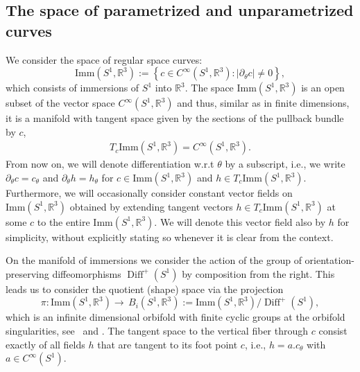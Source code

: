 \documentclass[12pt]{amsart}
\newcommand{\rev}[1]{#1}
\theoremstyle{definition}
\newcommand{\R}{\mathbb R}
\newcommand{\Diffp}{\operatorname{Diff}^+(S^1)}
\newcommand{\Imm}{\mathrm{Imm}}
\def\R{{\mathbb R}}
\begin{document}
\subsection*{The space of parametrized and unparametrized curves}
We consider the space of regular space curves:
\begin{equation}
  \Imm(S^1,\mathbb R^3):=\left\{c\in C^{\infty}(S^1,\mathbb R^3): |\rev{\partial_{\theta}c}|\neq 0\right\},
\end{equation}
which consists of immersions of $S^1$ into $\R^3$.
The space $\Imm(S^1,\mathbb R^3)$ is an open subset of the vector space $C^{\infty}(S^1,\mathbb R^3)$ and thus, similar as in finite dimensions, it  is a manifold with tangent space \rev{given by the sections of the pullback bundle by $c$},
\begin{align}
  T_c\Imm(S^1,\mathbb R^3)=C^{\infty}(S^1,\mathbb R^3). 
\end{align}
\rev{From now on, we will denote differentiation w.r.t $\theta$ by a subscript, i.e., we write $\partial_\theta c = c_\theta$ and $\partial_\theta h=h_\theta$ for $c\in \Imm(S^1,\R^3)$ and $h\in T_c \Imm(S^1,\R^3)$. Furthermore, we will occasionally consider constant vector fields on $\Imm(S^1,\mathbb R^3)$ obtained by extending tangent vectors $h\in T_c\Imm(S^1,\R^3)$ at some $c$ to the entire $\Imm(S^1,\mathbb R^3)$. We will denote this vector field also by $h$ for simplicity, without explicitly stating so whenever it is clear from the context.}

On the manifold of immersions we consider the action of the group of orientation-preserving diffeomorphisms $\Diffp$ by composition from the right. This leads us to consider the quotient (shape) space \rev{via the projection}
\begin{equation}
\rev{\pi: \Imm(S^1,\mathbb R^3)\to}\, B_i(S^1,\mathbb R^3):=\Imm(S^1,\mathbb R^3)/\Diffp,
\end{equation}
which is an infinite dimensional orbifold with finite cyclic groups at the orbifold singularities, see~\cite{cervera1991action} and \cite[7.3]{Michor20}. The tangent space to the vertical fiber through $c$ consist exactly of all fields $h$ that are tangent to its foot point $c$, i.e., $h=a.c_\theta$ with $a\in C^{\infty}(S^1)$. 
 
\end{document}
